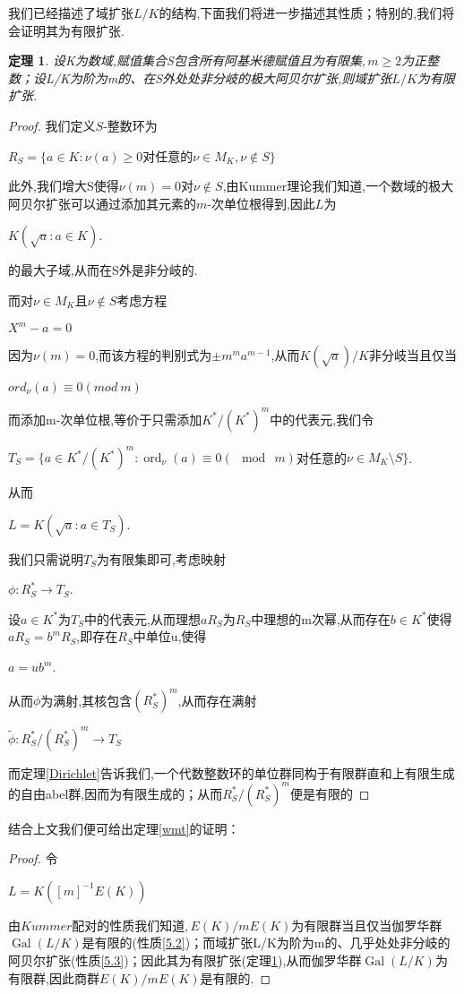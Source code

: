 \documentclass[11pt]{ctexart}
\DeclareMathOperator{\Ord}{ord}
\DeclareMathOperator{\Gal}{Gal}
\newtheorem{thm}{定理}[section]
\begin{document}
我们已经描述了域扩张$L/K$的结构,下面我们将进一步描述其性质；特别的,我们将会证明其为有限扩张.

\begin{thm}\label{5.4}设K为数域,赋值集合S包含所有阿基米德赋值且为有限集$,m\geq 2$为正整数；设L/K为阶为m的、在S外处处非分岐的极大阿贝尔扩张,则域扩张$L/K$为有限扩张.


\end{thm}
\begin{proof}我们定义$S$-整数环为
\begin{center}
    $R_{S}=\{a\in K:\nu(a)\geqslant 0$对任意的$\nu\in M_K,\nu \notin S\}$
\end{center}
此外,我们增大S使得$\nu(m)=0$对$\nu \notin S$,由Kummer理论我们知道,一个数域的极大阿贝尔扩张可以通过添加其元素的$m$-次单位根得到,因此$L$为
\begin{center}
    $K(\sqrt{a}:a\in K)$.
\end{center}
的最大子域,从而在S外是非分岐的.

而对$\nu \in M_K$且$\nu\notin S$考虑方程
\begin{center}
    $X^m-a=0$
\end{center}
因为$\nu(m)=0$,而该方程的判别式为$\pm m^ma^{m-1}$,从而$K(\sqrt{a})/K$非分岐当且仅当
\begin{center}
    $ord_{\nu}(a)\equiv 0(mod~m)$
\end{center}
而添加m-次单位根,等价于只需添加$K^{*}/(K^{*})^{m}$中的代表元,我们令
\begin{center}
    $T_{S}=\{a\in K^{*}/(K^{*})^{m}:\Ord_{\nu}(a)\equiv 0(\mod ~m)$对任意的$\nu\in M_K\setminus S\}$.
\end{center}
从而
\begin{center}
    $L=K(\sqrt{a}:a\in T_S)$.
\end{center}
我们只需说明$T_S$为有限集即可,考虑映射
\begin{center}
    $\phi:R_S^{*}\rightarrow T_S$.
\end{center}
设$a\in K^{*}$为$T_S$中的代表元,从而理想$aR_S$为$R_S$中理想的m次幂,从而存在$b \in K^{*}$使得$aR_S=b^mR_S$,即存在$R_S$中单位u,使得
\begin{center}
    $a=ub^m$.
\end{center}
从而$\phi$为满射,其核包含$(R_S^{*})^m$,从而存在满射
\begin{center}
    $\widetilde{\phi}:R_S^{*}/(R_S^{*})^m\rightarrow T_S$
\end{center}
而定理\ref{Dirichlet}告诉我们,一个代数整数环的单位群同构于有限群直和上有限生成的自由abel群,因而为有限生成的；从而$R_S^{*}/(R_S^{*})^m$便是有限的
\end{proof}
结合上文我们便可给出定理\ref{wmt}的证明：
\begin{proof}
    \noindent 令
    \begin{center}
        $L=K([m]^{-1}E(K))$
    \end{center}
    
    由$Kummer$配对的性质我们知道$,E(K)/mE(K)$为有限群当且仅当伽罗华群$\Gal(L/K)$是有限的(性质\ref{5.2})；而域扩张L/K为阶为m的、几乎处处非分岐的阿贝尔扩张(性质\ref{5.3})；因此其为有限扩张(定理\ref{5.4}),从而伽罗华群$\Gal(L/K)$为有限群,因此商群$E(K)/mE(K)$是有限的.       
\end{proof}
\end{document}
